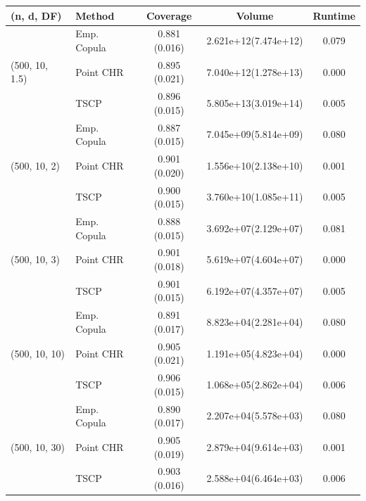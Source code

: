 \begin{tabular}[t]{l l c c c}
\toprule
(n, d, DF) & Method & Coverage & Volume & Runtime \\
\midrule
\multirow{3}{*}{(500, 10, 1.5)} 
& Emp. Copula & \color{blue}0.881 (0.016) & 2.621e+12(7.474e+12) & 0.079 \\
& Point CHR & 0.895 (0.021) & \color{red}7.040e+12(1.278e+13) & 0.000 \\
& TSCP & 0.896 (0.015) & 5.805e+13(3.019e+14) & 0.005 \\
\midrule
\multirow{3}{*}{(500, 10, 2)}
& Emp. Copula & \color{blue}0.887 (0.015) & 7.045e+09(5.814e+09) & 0.080 \\
& Point CHR & 0.901 (0.020) & \color{red}1.556e+10(2.138e+10) & 0.001 \\
& TSCP & 0.900 (0.015) & 3.760e+10(1.085e+11) & 0.005 \\
\midrule
\multirow{3}{*}{(500, 10, 3)}
& Emp. Copula & \color{blue}0.888 (0.015) & 3.692e+07(2.129e+07) & 0.081 \\
& Point CHR & 0.901 (0.018) & \color{red}5.619e+07(4.604e+07) & 0.000 \\
& TSCP & 0.901 (0.015) & 6.192e+07(4.357e+07) & 0.005 \\
\midrule
\multirow{3}{*}{(500, 10, 10)}
& Emp. Copula & \color{blue}0.891 (0.017) & 8.823e+04(2.281e+04) & 0.080 \\
& Point CHR & 0.905 (0.021) & 1.191e+05(4.823e+04) & 0.000 \\
& TSCP & 0.906 (0.015) & \color{red}1.068e+05(2.862e+04) & 0.006 \\
\midrule
\multirow{3}{*}{(500, 10, 30)}
& Emp. Copula & \color{blue}0.890 (0.017) & 2.207e+04(5.578e+03) & 0.080 \\
& Point CHR & 0.905 (0.019) & 2.879e+04(9.614e+03) & 0.001 \\
& TSCP & 0.903 (0.016) & \color{red}2.588e+04(6.464e+03) & 0.006 \\
\bottomrule
\end{tabular}